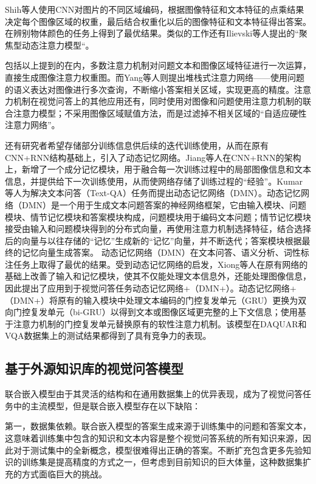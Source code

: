 Shih等人使用CNN对图片的不同区域编码，根据图像特征和文本特征的点乘结果决定每个图像区域的权重，最后结合权重化以后的图像特征和文本特征得出答案。在辨别物体颜色的任务上得到了最优结果。类似的工作还有Ilievski等人提出的“聚焦型动态注意力模型“。

包括以上提到的在内，多数注意力机制对问题文本和图像区域特征进行一次运算，直接生成图像注意力权重图。而Yang等人则提出堆栈式注意力网络——使用问题的语义表达对图像进行多次查询，不断缩小答案相关区域，实现更高的精度。注意力机制在视觉问答上的其他应用还有，同时使用对图像和问题使用注意力机制的联合注意力模型；不采用图像区域赋值方法，而是过滤掉不相关区域的“自适应硬性注意力网络”。

还有研究者希望存储部分训练信息供后续的迭代训练使用，从而在原有CNN+RNN结构基础上，引入了动态记忆网络。Jiang等人在CNN+RNN的架构上，新增了一个成分记忆模块，用于融合每一次训练过程中的局部图像信息和文本信息，并提供给下一次训练使用，从而使网络存储了训练过程的“经验”。Kumar等人为解决文本问答（Text-QA）任务而提出动态记忆网络（DMN）。动态记忆网络（DMN）是一个用于生成文本问题答案的神经网络框架，它由输入模块、问题模块、情节记忆模块和答案模块构成，问题模块用于编码文本问题；情节记忆模块接受由输入和问题模块得到的分布式向量，再使用注意力机制选择特征，结合选择后的向量与以往存储的“记忆”生成新的“记忆”向量，并不断迭代；答案模块根据最终的记忆向量生成答案。
动态记忆网络（DMN）在文本问答、语义分析、词性标注任务上取得了最优的结果。受到动态记忆网络的启发，Xiong等人在原有网络的基础上改善了输入和记忆模块，使其不仅能处理文本信息外，还能处理图像信息，因此提出了应用到于视觉问答任务动态记忆网络+（DMN+）。动态记忆网络+（DMN+）将原有的输入模块中处理文本编码的门控复发单元（GRU）更换为双向门控复发单元（bi-GRU）以得到文本或图像区域更完整的上下文信息；使用基于注意力机制的门控复发单元替换原有的软性注意力机制。该模型在DAQUAR和VQA数据集上的测试结果都得到了具有竞争力的表现。

\subsection{基于外源知识库的视觉问答模型}
联合嵌入模型由于其灵活的结构和在通用数据集上的优异表现，成为了视觉问答任务中的主流模型，但是联合嵌入模型存在以下缺陷：

第一，数据集依赖。联合嵌入模型的答案生成来源于训练集中的问题和答案文本，这意味着训练集中包含的知识和文本内容是整个视觉问答系统的所有知识来源，因此对于测试集中的全新概念，模型很难得出正确的答案。不断扩充包含更多先验知识的训练集是提高精度的方式之一，但考虑到目前知识的巨大体量，这种数据集扩充的方式面临巨大的挑战。

